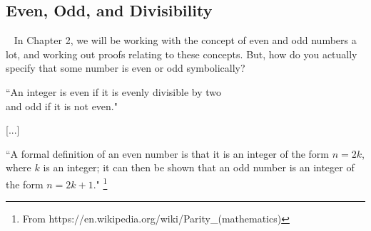 \documentclass[../Template-Assignment.tex]{subfiles}
\begin{document}
    \newpage

    \subsection{Even, Odd, and Divisibility}

        \begin{intro}{\ }
            In Chapter 2, we will be working with the concept of even and
            odd numbers a lot, and working out proofs relating to these concepts.
            But, how do you actually specify that some number is even or odd symbolically?

            \begin{center}
                ``An integer is even if it is evenly divisible by two\\ and odd if it is not even."

                [...]

                ``A formal definition of an even number is that it is an integer of the form $n = 2k$,
                where $k$ is an integer;
                it can then be shown that an odd number is an integer of the form $n = 2k + 1$."
                \footnote{From https://en.wikipedia.org/wiki/Parity\_(mathematics)}
            \end{center}

        \end{intro}
\end{document}
